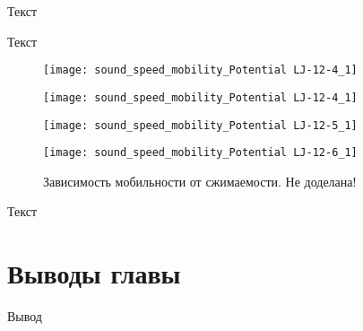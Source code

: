 Текст

Текст

\begin{figure}[htbp!]
\begin{center}
\begin{minipage}[h]{0.45\linewidth}
\texttt{[image: sound\_speed\_mobility\_Potential LJ-12-4\_1]}
\end{minipage}
\begin{minipage}[h]{0.45\linewidth}
\texttt{[image: sound\_speed\_mobility\_Potential LJ-12-4\_1]}
\end{minipage}


\begin{minipage}[h]{0.45\linewidth}
\texttt{[image: sound\_speed\_mobility\_Potential LJ-12-5\_1]}
\end{minipage}
\begin{minipage}[h]{0.45\linewidth}
\texttt{[image: sound\_speed\_mobility\_Potential LJ-12-6\_1]}
\end{minipage}
\caption{Зависимость мобильности от сжимаемости. Не доделана!}
\label{ris23}
\end{center}
\end{figure}

Текст

\section{Выводы главы}\label{C3_3}

Вывод